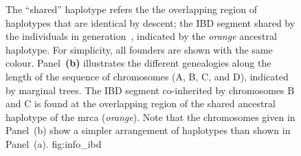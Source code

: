 \begin{figure}[p]
{The ``shared'' haplotype refers the the overlapping region of haplotypes that are identical by descent; \ie the IBD segment shared by the  individuals in generation~, indicated by the \emph{orange} ancestral haplotype.
For simplicity, all founders are shown with the same colour.
Panel~\textbf{(b)} illustrates the different genealogies along the length of the sequence of  chromosomes (A, B, C, and D), indicated by  marginal trees.
The IBD segment co-inherited by chromosomes B and C is found at the overlapping region of the shared ancestral haplotype of the \gls{mrca} (\emph{orange}).
Note that the  chromosomes given in Panel~(b) show a simpler arrangement of haplotypes than shown in Panel~(a).}
{fig:info_ibd}
\end{figure}
